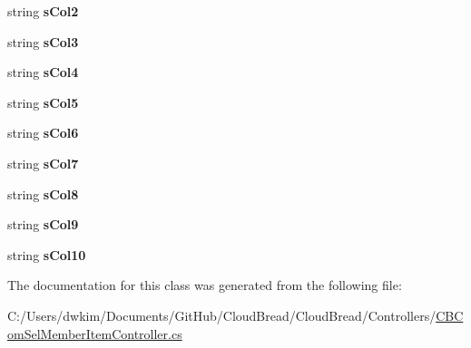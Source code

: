 \begin{DoxyCompactItemize}
\item 
string {\bfseries s\+Col2}\hypertarget{a00159_ae37f1b4a7942a7f4932a3018d80b7ccc}{}\label{a00159_ae37f1b4a7942a7f4932a3018d80b7ccc}

\item 
string {\bfseries s\+Col3}\hypertarget{a00159_a3fa0fc13a428bd8dfd50de8ff5b0b7bc}{}\label{a00159_a3fa0fc13a428bd8dfd50de8ff5b0b7bc}

\item 
string {\bfseries s\+Col4}\hypertarget{a00159_ae6edc78be28360da2ad774f4629095b6}{}\label{a00159_ae6edc78be28360da2ad774f4629095b6}

\item 
string {\bfseries s\+Col5}\hypertarget{a00159_a8f793e8b0a99e77e047066379034f979}{}\label{a00159_a8f793e8b0a99e77e047066379034f979}

\item 
string {\bfseries s\+Col6}\hypertarget{a00159_adef78c6983cb7fb97802247a395b6540}{}\label{a00159_adef78c6983cb7fb97802247a395b6540}

\item 
string {\bfseries s\+Col7}\hypertarget{a00159_a44d7018f2a722263a433c98959eefc92}{}\label{a00159_a44d7018f2a722263a433c98959eefc92}

\item 
string {\bfseries s\+Col8}\hypertarget{a00159_a95f5aa7e5dc0110789958bf2da630f72}{}\label{a00159_a95f5aa7e5dc0110789958bf2da630f72}

\item 
string {\bfseries s\+Col9}\hypertarget{a00159_aa4ed4bd166e02917dc3b6a5a6b1b22ab}{}\label{a00159_aa4ed4bd166e02917dc3b6a5a6b1b22ab}

\item 
string {\bfseries s\+Col10}\hypertarget{a00159_a576834912d5ed1cd0fba71a458354305}{}\label{a00159_a576834912d5ed1cd0fba71a458354305}

\end{DoxyCompactItemize}


The documentation for this class was generated from the following file\+:\begin{DoxyCompactItemize}
\item 
C\+:/\+Users/dwkim/\+Documents/\+Git\+Hub/\+Cloud\+Bread/\+Cloud\+Bread/\+Controllers/\hyperlink{a00205}{C\+B\+Com\+Sel\+Member\+Item\+Controller.\+cs}\end{DoxyCompactItemize}
